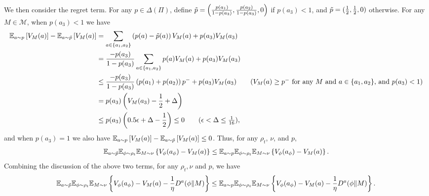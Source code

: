 We then consider the regret term. For any $p \in \Delta\left(\Pi\right)$, define $\Tilde{p} = \left(\frac{p(a_1)}{1-p(a_3)}, \frac{p(a_2)}{1-p(a_3)}, 0\right)$ if $p(a_3)<1$, and $\Tilde{p}=(\frac{1}{2}, \frac{1}{2}, 0)$ otherwise. For any $M \in \mathcal{M}$, when $p(a_3)<1$ we have 
\begin{align*}
    \E_{a \sim p}\left[V_{M}(a)\right] - \E_{a \sim \Tilde{p}}\left[V_M(a)\right] &=  \sum_{a \in \{a_1, a_2\}}\left(p(a) - \Tilde{p}(a)\right)V_{M}(a) + p(a_3)V_M(a_3) 
    \\&= \frac{-p(a_3)}{1-p(a_3)}\sum_{a \in \{a_1, a_2\}} p(a) V_M(a)  + p(a_3)V_M(a_3) 
    \\&\le \frac{-p(a_3)}{1-p(a_3)}\left(p(a_1) + p(a_2)\right)p^-  + p(a_3)V_M(a_3) \tag{$V_M(a) \ge p^-$ for any $M$ and $a \in \{a_1, a_2\}$, and $p(a_3) < 1$}
    \\&= p(a_3)\left(V_M(a_3) - \frac{1}{2} + \Delta\right)
    \\&\le p(a_3)\left(0.5\epsilon + \Delta -\frac{1}{2}\right) \le 0 \tag{$\epsilon < \Delta \leq \frac{1}{16}$}, 
\end{align*}
and when $p(a_3)=1$ we also have $\mathbb{E}_{a \sim p}\left[V_{M}(a)\right] - \mathbb{E}_{a \sim \Tilde{p}}\left[V_M(a)\right]\leq 0$.  
Thus, for any $\rho_t$, $\nu$, and $p$, 
\begin{align*}
    \mathbb{E}_{a\sim \Tilde{p}} \mathbb{E}_{\phi\sim \rho_t} \mathbb{E}_{M\sim \nu} \left\{V_\phi(a_\phi) - V_M (a)\right\} \le  \mathbb{E}_{a\sim p} \mathbb{E}_{\phi\sim \rho_t} \mathbb{E}_{M\sim \nu} \left\{V_\phi(a_\phi) - V_M(a)\right\}.
\end{align*}
Combining the discussion of the above two terms, for any $\rho_t, \nu$ and $p$, we have
\begin{align}
    \mathbb{E}_{a\sim \Tilde{p}} \mathbb{E}_{\phi\sim \rho_t} \mathbb{E}_{M\sim \nu} \left\{V_\phi(a_\phi) - V_M (a) - \frac{1}{\eta} D^{a}(\phi\|M) \right\} \le \mathbb{E}_{a\sim p} \mathbb{E}_{\phi\sim \rho_t} \mathbb{E}_{M\sim \nu} \left\{V_\phi(a_\phi) - V_M (a) - \frac{1}{\eta} D^{a}(\phi\| M) \right\}. 
\label{eq:minmax_start}
\end{align}


